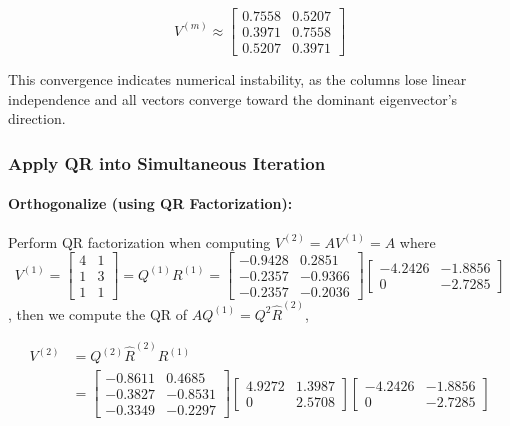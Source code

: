 \documentclass[12pt]{article}
\begin{document}
$$
V^{(m)} \approx \begin{bmatrix} 0.7558 & 0.5207 \\ 0.3971 & 0.7558 \\ 0.5207 & 0.3971 \end{bmatrix}
$$

This convergence indicates numerical instability, as the columns lose linear independence and all vectors converge toward the dominant eigenvector's direction.

\subsubsection*{Apply QR into Simultaneous Iteration}

\paragraph{Orthogonalize (using QR Factorization):}

Perform QR factorization when computing $V^{(2)}= AV^{(1)} = A$ where
$$
V^{(1)} = \begin{bmatrix} 4 & 1 \\ 1 & 3 \\ 1 & 1 \end{bmatrix} =Q^{(1)}R^{(1)}=  \begin{bmatrix}
-0.9428 & 0.2851 \\
-0.2357 & -0.9366 \\
-0.2357 & -0.2036
\end{bmatrix} \begin{bmatrix}
-4.2426 & -1.8856 \\
0 & -2.7285
\end{bmatrix}
$$,
then we compute the QR of $AQ^{(1)} = Q^{2} \hat{R}^{(2)}$,

$$
\begin{aligned}
    V^{(2)}& =Q^{(2)} \hat{R}^{(2)}R^{(1)}\\
            & = \begin{bmatrix}
-0.8611 & 0.4685 \\
-0.3827 & -0.8531 \\
-0.3349 & -0.2297
\end{bmatrix} \begin{bmatrix}
4.9272 & 1.3987 \\
0 & 2.5708
\end{bmatrix}\begin{bmatrix}
-4.2426 & -1.8856 \\
0 & -2.7285
\end{bmatrix}
\end{aligned}
$$
\end{document}
